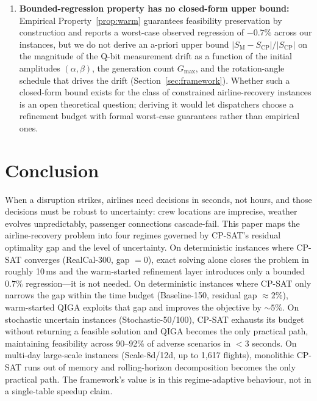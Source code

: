 \documentclass[12pt,number]{elsarticle}
\begin{document}
\begin{enumerate}
    \item \textbf{Bounded-regression property has no closed-form upper bound:} Empirical Property~\ref{prop:warm} guarantees feasibility preservation by construction and reports a worst-case observed regression of $-0.7\%$ across our instances, but we do not derive an a-priori upper bound $|S_{\mathrm{M}} - S_{\mathrm{CP}}|/|S_{\mathrm{CP}}|$ on the magnitude of the Q-bit measurement drift as a function of the initial amplitudes $(\alpha, \beta)$, the generation count $G_{\max}$, and the rotation-angle schedule that drives the drift (Section~\ref{sec:framework}). Whether such a closed-form bound exists for the class of constrained airline-recovery instances is an open theoretical question; deriving it would let dispatchers choose a refinement budget with formal worst-case guarantees rather than empirical ones.
\end{enumerate}


\section{Conclusion}
\label{sec:conclusion}

When a disruption strikes, airlines need decisions in seconds, not hours, and those decisions must be robust to uncertainty: crew locations are imprecise, weather evolves unpredictably, passenger connections cascade-fail. This paper maps the airline-recovery problem into four regimes governed by CP-SAT's residual optimality gap and the level of uncertainty. On deterministic instances where CP-SAT converges (RealCal-300, gap $=0$), exact solving alone closes the problem in roughly 10\,ms and the warm-started refinement layer introduces only a bounded $0.7\%$ regression---it is not needed. On deterministic instances where CP-SAT only narrows the gap within the time budget (Baseline-150, residual gap $\approx 2\%$), warm-started QIGA exploits that gap and improves the objective by $\sim 5\%$. On stochastic uncertain instances (Stochastic-50/100), CP-SAT exhausts its budget without returning a feasible solution and QIGA becomes the only practical path, maintaining feasibility across 90--92\% of adverse scenarios in $<$3 seconds. On multi-day large-scale instances (Scale-8d/12d, up to 1{,}617 flights), monolithic CP-SAT runs out of memory and rolling-horizon decomposition becomes the only practical path. The framework's value is in this regime-adaptive behaviour, not in a single-table speedup claim.
\end{document}
